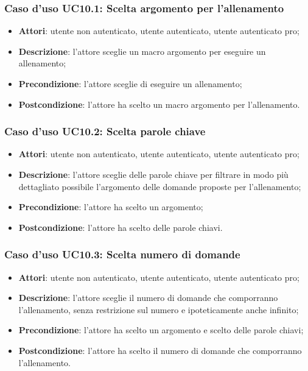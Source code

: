 \subsubsection{Caso d'uso UC10.1: Scelta argomento per l'allenamento}
	\begin{itemize}
		\item \textbf{Attori}: utente non autenticato, utente autenticato, utente autenticato pro;
		\item \textbf{Descrizione}: l'attore sceglie un macro argomento per eseguire un allenamento;
		\item \textbf{Precondizione}: l'attore sceglie di eseguire un allenamento;
		\item \textbf{Postcondizione}: l'attore ha scelto un macro argomento per l'allenamento.
	\end{itemize}
\subsubsection{Caso d'uso UC10.2: Scelta parole chiave}
	\begin{itemize}
		\item \textbf{Attori}: utente non autenticato, utente autenticato, utente autenticato pro;
		\item \textbf{Descrizione}: l'attore sceglie delle parole chiave per filtrare in modo più dettagliato possibile l'argomento delle domande proposte per l'allenamento;
		\item \textbf{Precondizione}: l'attore ha scelto un argomento;
		\item \textbf{Postcondizione}: l'attore ha scelto delle parole chiavi.
	\end{itemize}
\subsubsection{Caso d'uso UC10.3: Scelta numero di domande}
	\begin{itemize}
		\item \textbf{Attori}: utente non autenticato, utente autenticato, utente autenticato pro;
		\item \textbf{Descrizione}: l'attore sceglie il numero di domande che comporranno l'allenamento, senza restrizione sul numero e ipoteticamente anche infinito;
		\item \textbf{Precondizione}: l'attore ha scelto un argomento e scelto delle parole chiavi;
		\item \textbf{Postcondizione}: l'attore ha scelto il numero di domande che comporranno l'allenamento.
	\end{itemize}
